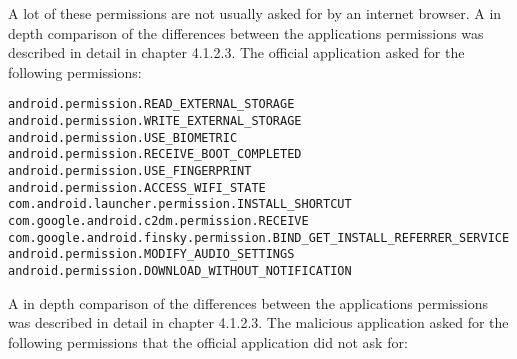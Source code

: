 A lot of these permissions are not usually asked for by an internet browser.
A in depth comparison of the differences between the applications permissions was described in detail in chapter 4.1.2.3.
\newpage
{}
The official application asked for the following permissions:

\texttt{android.permission.READ\_EXTERNAL\_STORAGE }
\newline \texttt{android.permission.WRITE\_EXTERNAL\_STORAGE }
\newline \texttt{android.permission.USE\_BIOMETRIC }
\newline \texttt{android.permission.RECEIVE\_BOOT\_COMPLETED}
\newline \texttt{android.permission.USE\_FINGERPRINT }
\newline \texttt{android.permission.ACCESS\_WIFI\_STATE}
\newline \texttt{com.android.launcher.permission.INSTALL\_SHORTCUT }
\newline \texttt{com.google.android.c2dm.permission.RECEIVE}
\newline \texttt{com.google.android.finsky.permission.BIND\_GET\_INSTALL\_REFERRER\_SERVICE}
\newline \texttt{android.permission.MODIFY\_AUDIO\_SETTINGS }
\newline \texttt{android.permission.DOWNLOAD\_WITHOUT\_NOTIFICATION}

A in depth comparison of the differences between the applications permissions was described in detail in chapter 4.1.2.3.
\newpage
{}
The malicious application asked for the following permissions that the official application did not ask for:

